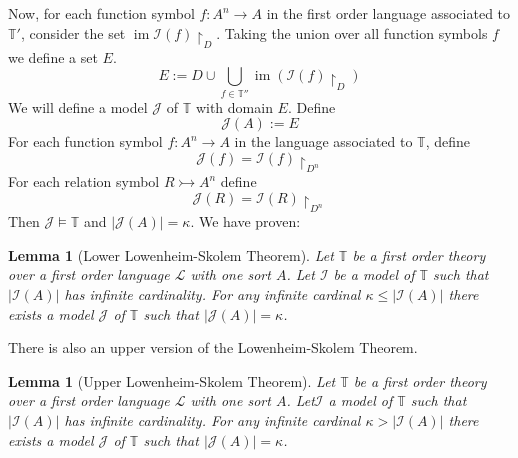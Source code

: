 \documentclass[12pt]{article}
\theoremstyle{plain}
\newtheorem{lemma}[thm]{Lemma}
\theoremstyle{definition}
\newcommand{\bb}[1]{\mathbb{#1}}
\newcommand{\call}[1]{\mathcal{#1}}
\newcommand{\lto}{\longrightarrow}
\begin{document}
Now, for each function symbol $f: A^n \lto A$ in the first order language associated to $\bb{T}'$, consider the set $\operatorname{im}\call{I}(f)\restriction_{D}$. Taking the union over all function symbols $f$ we define a set $E$.
\begin{equation}
	E := D \cup \bigcup_{f \in \bb{T}''}\operatorname{im}(\call{I}(f)\restriction_D)
	\end{equation}
We will define a model $\call{J}$ of $\bb{T}$ with domain $E$. Define
\begin{equation}
	\call{J}(A) := E
	\end{equation}
For each function symbol $f: A^n \lto A$ in the language associated to $\bb{T}$, define
\begin{equation}
	\call{J}(f) = \call{I}(f)\restriction_{D^n}
	\end{equation}
For each relation symbol $R \rightarrowtail A^n$ define
\begin{equation}
	\call{J}(R) = \call{I}(R)\restriction_{D^n}
	\end{equation}
Then $\call{J} \models \bb{T}$ and $|\call{J}(A)| = \kappa$.
We have proven:
\begin{lemma}[Lower Lowenheim-Skolem Theorem]
	Let $\bb{T}$ be a first order theory over a first order language $\call{L}$ with one sort $A$. Let $\call{I}$ be a model of $\bb{T}$ such that $|\call{I}(A)|$ has infinite cardinality. For any infinite cardinal $\kappa \leq |\call{I}(A)|$ there exists a model $\call{J}$ of $\bb{T}$ such that $|\call{J}(A)| = \kappa$.
	\end{lemma}
There is also an upper version of the Lowenheim-Skolem Theorem.
	\begin{lemma}[Upper Lowenheim-Skolem Theorem]
		Let $\bb{T}$ be a first order theory over a first order language $\call{L}$ with one sort $A$. Let$\call{I}$ a model of $\bb{T}$ such that $|\call{I}(A)|$ has infinite cardinality. For any infinite cardinal $\kappa > |\call{I}(A)|$ there exists a model $\call{J}$ of $\bb{T}$ such that $|\call{J}(A)| = \kappa$.
		\end{lemma}
\end{document}
